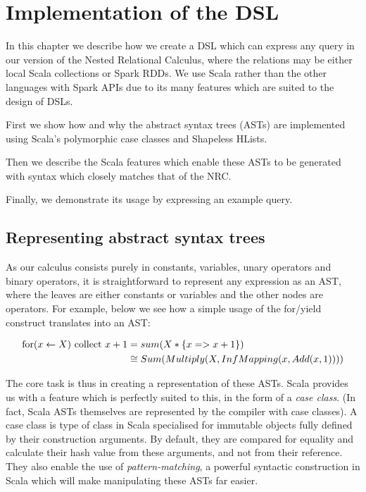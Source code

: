 \chapter{Implementation of the DSL} \label{dsl}

In this chapter we describe how we create a DSL which can express any query in our version of the Nested Relational Calculus, where the relations may be either local Scala collections or Spark RDDs. We use Scala rather than the other languages with Spark APIs due to its many features which are suited to the design of DSLs.

First we show how and why the abstract syntax trees (ASTs) are implemented using Scala's polymorphic case classes and Shapeless HLists.

Then we describe the Scala features which enable these ASTs to be generated with syntax which closely matches that of the NRC.

Finally, we demonstrate its usage by expressing an example query.


\section{Representing abstract syntax trees}

As our calculus consists purely in constants, variables, unary operators and binary operators, it is straightforward to represent any expression as an AST, where the leaves are either constants or variables and the other nodes are operators. For example, below we see how a simple usage of the for/yield construct translates into an AST:

\begin{equation*}
\begin{split}
\textrm{for}(x \leftarrow X) \textrm{ collect } x + 1 &= sum(X*\{x => x + 1\}) \\
&\cong Sum(Multiply(X,InfMapping(x,Add(x,1))))
\end{split}
\end{equation*}

The core task is thus in creating a representation of these ASTs. Scala provides us with a feature which is perfectly suited to this, in the form of a \textit{case class}. (In fact, Scala ASTs themselves are represented by the compiler with case classes). A case class is type of class in Scala specialised for immutable objects fully defined by their construction arguments. By default, they are compared for equality and calculate their hash value from these arguments, and not from their reference. They also enable the use of \textit{pattern-matching}, a powerful syntactic construction in Scala which will make manipulating these ASTs far easier.

